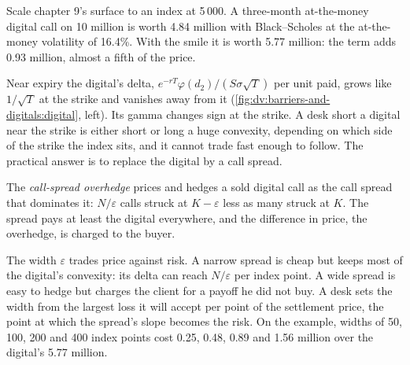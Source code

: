 \begin{example}\label{ex:dv:barriers-and-digitals:smile}
Scale chapter 9's surface to an index at 5\,000. A three-month at-the-money digital call on 10 million is worth
4.84 million with Black--Scholes at the at-the-money volatility of 16.4\%. With the smile it is worth 5.77 million:
the  term adds 0.93 million, almost a fifth of the price.
\end{example}

Near expiry the digital's delta, $e^{-rT}\varphi(d_2)/(S\sigma\sqrt T)$ per unit paid, grows like $1/\sqrt T$ at the
strike and vanishes away from it (\cref{fig:dv:barriers-and-digitals:digital}, left). Its gamma changes sign at the
strike. A desk short a digital near the strike is either short or long a huge convexity, depending on which side
of the strike the index sits, and it cannot trade fast enough to follow. The practical answer is to replace the
digital by a call spread.

\begin{definition}\label{def:dv:barriers-and-digitals:overhedge}
The \emph{call-spread overhedge} prices and hedges a sold digital call as the call
spread that dominates it: $N/\varepsilon$ calls struck at $K-\varepsilon$ less as many struck at $K$. The spread
pays at least the digital everywhere, and the difference in price, the overhedge, is charged to the buyer.
\end{definition}

The width $\varepsilon$ trades price against risk. A narrow spread is cheap but keeps most of the digital's
convexity: its delta can reach $N/\varepsilon$ per index point. A wide spread is easy to hedge but charges the client
for a payoff he did not buy. A desk sets the width from the largest loss it will accept per point of the
settlement price, the point at which the spread's slope becomes the risk. On the example, widths of 50, 100, 200
and 400 index points cost 0.25, 0.48, 0.89 and 1.56 million over the digital's 5.77 million.

